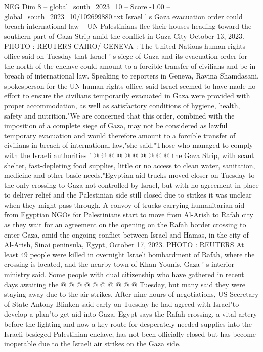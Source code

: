 \begin{textsample}{NEG Dim 8 – global\_south\_2023\_10 – Score -1.00 – global\_south\_2023\_10/102699880.txt}  \label{ex:f8_neg_097}
Israel ' s Gaza evacuation order could breach international law -- UN Palestinians flee their houses heading toward the southern part of Gaza Strip amid the conflict in Gaza City October 13, 2023.
PHOTO : REUTERS CAIRO/ GENEVA : The United Nations human rights office said on Tuesday that Israel ' s siege of Gaza and its evacuation order for the north of the enclave could amount to a forcible transfer of civilians and be in breach of international law.
Speaking to reporters in Geneva, Ravina Shamdasani, spokesperson for the UN human rights office, said Israel seemed to have made no effort to ensure the civilians temporarily evacuated in Gaza were provided with proper accommodation, as well as satisfactory conditions of hygiene, health, safety and nutrition."We are concerned that this order, combined with the imposition of a complete siege of Gaza, may not be considered as lawful temporary evacuation and would therefore amount to a forcible transfer of civilians in breach of international law,"she said."Those who managed to comply with the Israeli authorities ' @ @ @ @ @ @ @ @ @ @ the Gaza Strip, with scant shelter, fast-depleting food supplies, little or no access to clean water, sanitation, medicine and other basic needs."Egyptian aid trucks moved closer on Tuesday to the only crossing to Gaza not controlled by Israel, but with no agreement in place to deliver relief and the Palestinian side still closed due to strikes it was unclear when they might pass through.
A convoy of trucks carrying humanitarian aid from Egyptian NGOs for Palestinians start to move from Al-Arish to Rafah city as they wait for an agreement on the opening on the Rafah border crossing to enter Gaza, amid the ongoing conflict between Israel and Hamas, in the city of Al-Arish, Sinai peninsula, Egypt, October 17, 2023.
PHOTO : REUTERS At least 49 people were killed in overnight Israeli bombardment of Rafah, where the crossing is located, and the nearby town of Khan Younis, Gaza ' s interior ministry said.
Some people with dual citizenship who have gathered in recent days awaiting the @ @ @ @ @ @ @ @ @ @ Tuesday, but many said they were staying away due to the air strikes.
After nine hours of negotiations, US Secretary of State Antony Blinken said early on Tuesday he had agreed with Israel"to develop a plan"to get aid into Gaza.
Egypt says the Rafah crossing, a vital artery before the fighting and now a key route for desperately needed supplies into the Israeli-besieged Palestinian enclave, has not been officially closed but has become inoperable due to the Israeli air strikes on the Gaza side.

\end{textsample}
